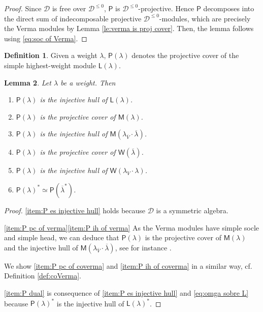 \documentclass[reqno]{amsart}
\newcommand{\oV}{\overline{V}}
\renewcommand{\_}[1]{_{\left( #1 \right)}}
\renewcommand{\^}[1]{^{\left( #1 \right)}}
\newcommand\fL{\mathsf{L}}
\newcommand\fM{\mathsf{M}}
\newcommand\fP{\mathsf{P}}
\newcommand\fW{\mathsf{W}}
\newcommand{\D}{\mathcal{D}}
\theoremstyle{plain}
\newtheorem{lema}{Lemma}[section]
\theoremstyle{definition}
\newtheorem{definition}[lema]{Definition}
\theoremstyle{remark}
\begin{document}
\begin{proof}
Since $\D$ is free over $\D^{\leq0}$, $\fP$ is $\D^{\leq0}$-projective. Hence $\fP$ decomposes into the direct sum of indecomposable projective $\D^{\leq0}$-modules, which are precisely the Verma modules by Lemma \ref{le:verma is proj cover}. Then, the lemma follows using \eqref{eq:soc of Verma}. 
\end{proof}


\begin{definition}\label{def:Plambda}
Given a weight $\lambda$, $\fP(\lambda)$ denotes the projective cover of the simple highest-weight module $\fL(\lambda)$.  
\end{definition}

\begin{lema}\label{le:about P}
Let $\lambda$ be a weight. Then
\begin{enumerate}[label=(\roman*)]
\item\label{item:P es injective hull} $\fP(\lambda)$ is the injective hull of $\fL(\lambda)$.
\smallskip
\item\label{item:P pc of verma} $\fP(\lambda)$ is the projective cover of $\fM(\lambda)$.
\smallskip
\item\label{item:P ih of verma} $\fP(\lambda)$ is the injective hull of $\fM\left(\lambda_{\oV}\cdot\overline{\lambda}\right)$.
\smallskip
\item\label{item:P pc of coverma} $\fP(\lambda)$ is the projective cover of $\fW(\overline{\lambda})$.
\smallskip
\item\label{item:P ih of coverma} $\fP(\lambda)$ is the injective hull of $\fW\left(\lambda_V\cdot\lambda\right)$.
\smallskip
\item\label{item:P dual} $\fP(\lambda)^*\simeq \fP\left(\overline{\lambda}^*\right)$.
\end{enumerate}
\end{lema}

\begin{proof}
\ref{item:P es injective hull} holds because $\D$ is a symmetric algebra.

\ref{item:P pc of verma}\ref{item:P ih of verma} As the Verma modules have simple socle and simple head, we can deduce that $\fP(\lambda)$ is the projective cover of $\fM(\lambda)$ and the injective hull of $\fM(\lambda_{\oV}\cdot\overline{\lambda})$, see for instance \cite[(6.25)]{MR1038525}. 

We show \ref{item:P pc of coverma} and \ref{item:P ih of coverma} in a similar way, cf. Definition \ref{def:coVerma}.

\ref{item:P dual} is consequence of \ref{item:P es injective hull} and \eqref{eq:omga sobre L} because $\fP(\lambda)^*$ is the injective hull of $\fL(\lambda)^*$.
\end{proof}
\end{document}
